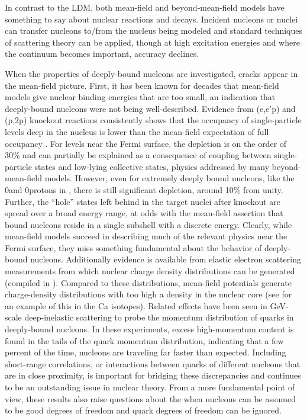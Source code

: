 
In contrast to the LDM, both mean-field and beyond-mean-field models have
something to say about nuclear reactions and decays. Incident nucleons or nuclei can
transfer nucleons to/from the nucleus being modeled and standard
techniques of scattering theory can be applied, though at high excitation
energies and where the continuum becomes important, accuracy declines.

When the properties of deeply-bound nucleons are investigated, cracks appear in the mean-field
picture. First, it has been known for decades that mean-field models give nuclear binding energies
that are too small, an indication that deeply-bound nucleons were not being well-described. Evidence
from (e,e'p) and (p,2p) knockout reactions 
consistently shows that the occupancy of single-particle levels deep in the nucleus is lower
than the mean-field expectation of full occupancy \cite{Mougey1980, Jacob1973}.
For levels near the Fermi surface, the depletion is on the order of 30\% and can partially be
explained as a consequence of coupling between single-particle states and low-lying collective
states, physics addressed by many beyond-mean-field models. However, even for extremely deeply bound
nucleons, like the 0\sOne and 0\pThree protons in \pbEight, there is still significant depletion,
around 10\% from unity. Further, the ``hole'' states left behind in the target nuclei after knockout are
spread over a broad energy range, at odds with the mean-field assertion that bound nucleons
reside in a single subshell with a discrete energy. Clearly, while mean-field models succeed in
describing much of the relevant physics near the Fermi surface, they miss something fundamental
about the behavior of deeply-bound nucleons. 
Additionally evidence is available from elastic electron scattering measurements from which nuclear
charge density distributions can be generated (compiled in \cite{DeVries1987}). Compared to these
distributions, mean-field potentials generate charge-density distributions with too high a density
in the nuclear core (see \cite{Brown1979} for an example of this in the Ca isotopes).
Related effects have been seen in GeV-scale deep-inelastic scattering to probe the momentum
distribution of quarks in deeply-bound nucleons. In these experiments, excess high-momentum
content is found in the tails of the quark momentum distribution, indicating that a few percent of the time, 
nucleons are traveling far faster than expected. Including short-range
correlations, or interactions between quarks of different nucleons that are in close proximity,
is important for bridging these discrepancies and continues to be an outstanding issue in nuclear 
theory. From a more fundamental point of view, these results also raise questions about the when nucleons
can be assumed to be good degrees of freedom and quark degrees of freedom can be ignored.

